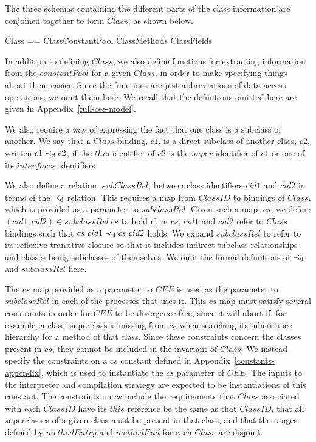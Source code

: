 The three schemas containing the different parts of the class
information are conjoined together to form $Class$, as shown below.
\begin{zed}
  Class == ClassConstantPool \land ClassMethods \land ClassFields
\end{zed}

In addition to defining $Class$, we also define functions for
extracting information from the $constantPool$ for a given $Class$, in
order to make specifying things about them easier.
Since the functions are just abbreviations of data access operations,
we omit them here.
We recall that the definitions omitted here are given in
Appendix~\ref{full-cee-model}.

We also require a way of expressing the fact that one class is a
subclass of another.
We say that a $Class$ binding, $c1$, is a direct subclass of another
class, $c2$, written $c1 \prec_{\mathrm{d}} c2$, if the $this$ identifier
of $c2$ is the $super$ identifier of $c1$ or one of its $interfaces$
identifiers.

We also define a relation, $subClassRel$, between class identifiers
$cid1$ and $cid2$ in terms of the $\prec_{\mathrm{d}}$ relation.
This requires a map from $ClassID$ to bindings of $Class$, which is
provided as a parameter to $subclassRel$.
Given such a map, $cs$, we define $(cid1,cid2) \in subclassRel~cs$ to
hold if, in $cs$, $cid1$ and $cid2$ refer to $Class$ bindings such
that $cs~cid1 \prec_{\mathrm{d}} cs~cid2$ holds.
We expand $subclassRel$ to refer to its reflexive transitive closure
so that it includes indirect subclass relationships and classes being
subclasses of themselves.
We omit the formal definitions of $\prec_{\mathrm{d}}$ and $subclassRel$
here.

The $cs$ map provided as a parameter to $CEE$ is used as the parameter
to $subclassRel$ in each of the processes that uses it.
This $cs$ map must satisfy several constraints in order for $CEE$ to
be divergence-free, since it will abort if, for example, a class'
superclass is missing from $cs$ when searching its inheritance
hierarchy for a method of that class.
Since these constraints concern the classes present in $cs$, they
cannot be included in the invariant of $Class$.
We instead specify the constraints on a $cs$ constant defined in
Appendix~\ref{constants-appendix}, which is used to instantiate the
$cs$ parameter of $CEE$.
The inputs to the interpreter and compilation strategy are expected to
be instantiations of this constant.
The constraints on $cs$ include the requirements that $Class$
associated with each $ClassID$ have its $this$ reference be the same
as that $ClassID$, that all superclasses of a given class must be
present in that class, and that the ranges defined by $methodEntry$
and $methodEnd$ for each $Class$ are disjoint.

